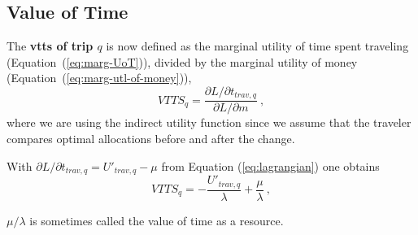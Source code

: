




\subsection{Value of Time}

The \textbf{\gls{vtts} of trip $q$} is now defined as the marginal utility of time spent traveling (Equation~(\ref{eq:marg-UoT})), divided by the marginal utility of money (Equation~(\ref{eq:marg-utl-of-money})), \ie
%
\begin{equation}
VTTS_q = \frac{\partial L/\partial t_{trav,q}}{\partial L/\partial m} \ ,
\label{eq:vot}
\end{equation}
where we are using the indirect utility function 
since we assume that the traveler compares optimal allocations before and after the change.

With $\partial L / \partial t_{trav,q} = U'_{trav,q} - \mu$ from Equation (\ref{eq:lagrangian}) one obtains
\begin{equation}
VTTS_q 
= - \frac{U'_{trav,q}}{\lambda} + \frac{\mu}{\lambda} \ ,
\label{eq:vot2}
\end{equation}

$\mu/\lambda$ is sometimes called the value of time as a resource.


